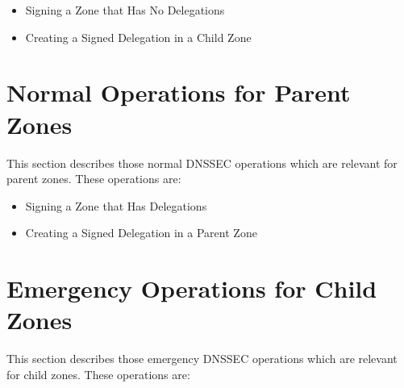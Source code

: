 \documentclass[12pt]{article}
\begin{document}
\begin{itemize}
\item Signing a Zone that Has No Delegations
\item Creating a Signed Delegation in a Child Zone
\end{itemize}





\clearpage

\section{Normal Operations for Parent Zones}
\label{normal-parent}

This section describes those normal DNSSEC operations which are relevant
for parent zones.  These operations are:

\begin{itemize}
\item Signing a Zone that Has Delegations
\item Creating a Signed Delegation in a Parent Zone
\end{itemize}





\clearpage

\section{Emergency Operations for Child Zones}
\label{emergency-child}

This section describes those emergency DNSSEC operations which are relevant
for child zones.  These operations are:
\end{document}
